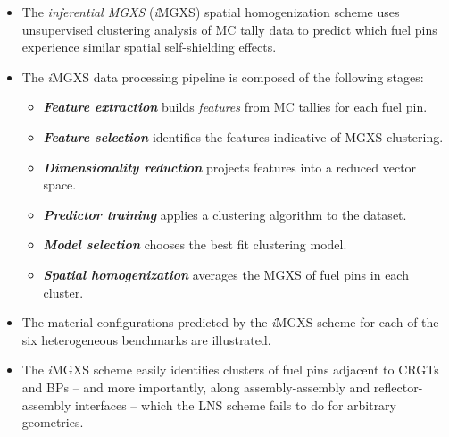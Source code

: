 \vfill
\begin{highlightsbox}[frametitle=Highlights]
\begin{itemize}
  \item The \textit{inferential \ac{MGXS}} (\textit{i}\ac{MGXS}) spatial homogenization scheme uses unsupervised clustering analysis of \ac{MC} tally data to predict which fuel pins experience similar spatial self-shielding effects.
  \item The \textit{i}\ac{MGXS} data processing pipeline is composed of the following stages:
  \begin{itemize}
    \item \textit{\textbf{Feature extraction}} builds \textit{features} from \ac{MC} tallies for each fuel pin.
    \item \textit{\textbf{Feature selection}} identifies the features indicative of \ac{MGXS} clustering.
    \item \textit{\textbf{Dimensionality reduction}} projects features into a reduced vector space.
    \item \textit{\textbf{Predictor training}} applies a clustering algorithm to the dataset.
    \item \textit{\textbf{Model selection}} chooses the best fit clustering model.
    \item \textit{\textbf{Spatial homogenization}} averages the \ac{MGXS} of fuel pins in each cluster.  \end{itemize}
  \item The material configurations predicted by the \textit{i}\ac{MGXS} scheme for each of the six heterogeneous benchmarks are illustrated.
  \item The \textit{i}\ac{MGXS} scheme easily identifies clusters of fuel pins adjacent to \acp{CRGT} and \acp{BP} -- and more importantly, along assembly-assembly and reflector-assembly interfaces -- which the \ac{LNS} scheme fails to do for arbitrary geometries.
\end{itemize}
\end{highlightsbox}
\vfill
